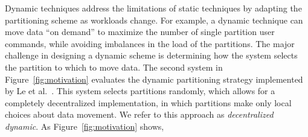 Dynamic techniques address the limitations of static techniques by adapting
the partitioning scheme as workloads change.  
For example, a dynamic technique can move data ``on demand'' to maximize the number of single partition user commands, while avoiding imbalances in the load of the partitions.  
The major challenge in designing a dynamic
scheme is determining how the system selects the partition to which to
move data.
%
The second system in Figure~\ref{fig:motivation} evaluates the dynamic
partitioning strategy implemented by  Le et al.~\cite{hoang2016}.
This system selects partitions randomly, which allows for a completely 
decentralized implementation, in which partitions make only local
choices about data movement.  We refer to this approach as
\emph{decentralized dynamic}.  As Figure~\ref{fig:motivation} shows,
